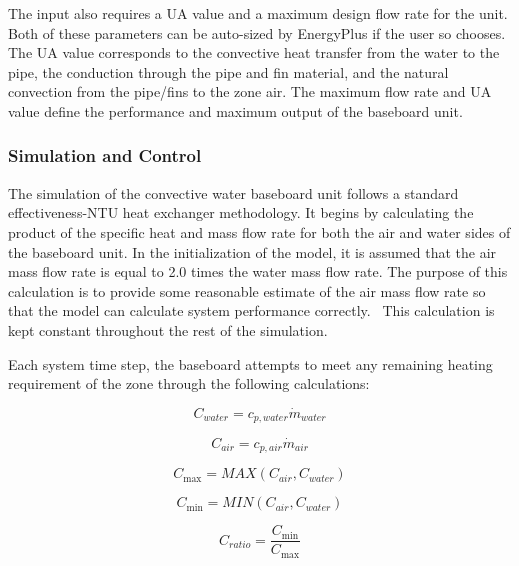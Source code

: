 The input also requires a UA value and a maximum design flow rate for the unit. Both of these parameters can be auto-sized by EnergyPlus if the user so chooses. The UA value corresponds to the convective heat transfer from the water to the pipe, the conduction through the pipe and fin material, and the natural convection from the pipe/fins to the zone air. The maximum flow rate and UA value define the performance and maximum output of the baseboard unit.

\subsubsection{Simulation and Control}\label{simulation-and-control-000}

The simulation of the convective water baseboard unit follows a standard effectiveness-NTU heat exchanger methodology. It begins by calculating the product of the specific heat and mass flow rate for both the air and water sides of the baseboard unit. In the initialization of the model, it is assumed that the air mass flow rate is equal to 2.0 times the water mass flow rate. The purpose of this calculation is to provide some reasonable estimate of the air mass flow rate so that the model can calculate system performance correctly.~ This calculation is kept constant throughout the rest of the simulation.

Each system time step, the baseboard attempts to meet any remaining heating requirement of the zone through the following calculations:

\begin{equation}
{C_{water}} = {c_{p,water}}{\dot m_{water}}
\end{equation}

\begin{equation}
{C_{air}} = {c_{p,air}}{\dot m_{air}}
\end{equation}

\begin{equation}
{C_{\max }} = MAX\left( {{C_{air}},{C_{water}}} \right)
\end{equation}

\begin{equation}
{C_{\min }} = MIN\left( {{C_{air}},{C_{water}}} \right)
\end{equation}

\begin{equation}
{C_{ratio}} = {\frac{{{C_{\min }}}}{{C_{\max }}}}
\end{equation}

